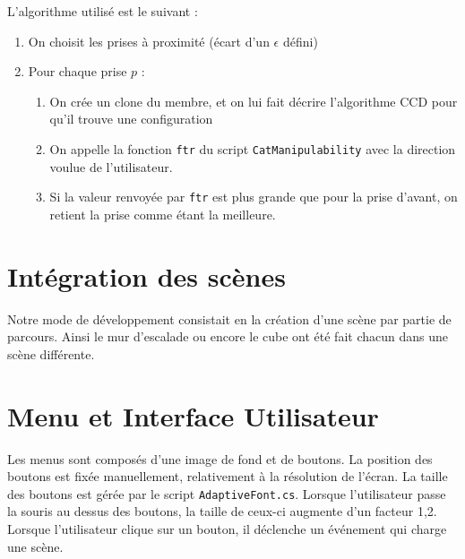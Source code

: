 \documentclass[a4paper,11pt]{article}
\begin{document}
L'algorithme utilisé est le suivant : 
\begin{enumerate}
\item On choisit les prises à proximité (écart d'un $\epsilon$ défini)
\item Pour chaque prise $p$ : 
\begin{enumerate}
\item On crée un clone du membre, et on lui fait décrire l'algorithme CCD pour qu'il trouve une configuration
\item On appelle la fonction \texttt{ftr} du script \texttt{CatManipulability} avec la direction voulue de l'utilisateur. 
\item Si la valeur renvoyée par \texttt{ftr} est plus grande que pour la prise d'avant, on retient la prise comme étant la meilleure.
\end{enumerate}
\end{enumerate}


\section{Intégration des scènes}
Notre mode de développement consistait en la création d’une scène par partie de parcours. Ainsi le mur d’escalade ou encore le cube ont été fait chacun dans une scène différente. 

\section{Menu et Interface Utilisateur}

Les menus sont composés d'une image de fond et de boutons. La position des boutons est fixée manuellement, relativement à la résolution de l'écran. La taille des boutons est gérée par le script \texttt{AdaptiveFont.cs}. Lorsque l'utilisateur passe la souris au dessus des boutons, la taille de ceux-ci augmente d'un facteur 1,2. Lorsque l'utilisateur clique sur un bouton, il déclenche un événement qui charge une scène.
\end{document}

